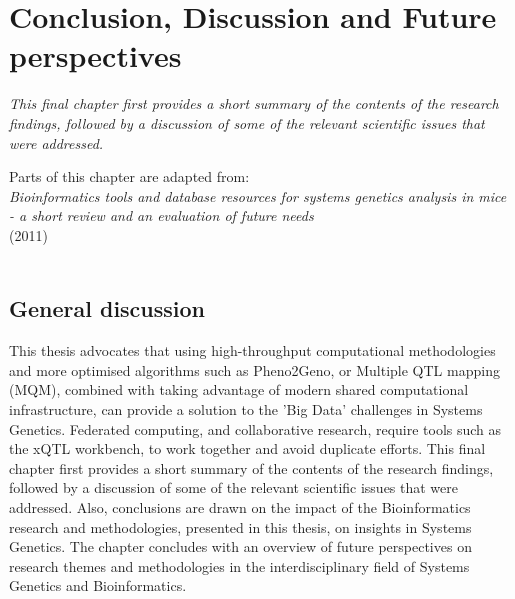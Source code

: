 \chapter{Conclusion, Discussion and Future perspectives}
\thispagestyle{empty}
\emph{This final chapter first provides a short summary of the contents of the research findings, followed by a discussion of 
some of the relevant scientific issues that were addressed.}
\null
\vfill

\begin{myexampleblock}{Parts of this chapter are adapted from:}
  \\
  \emph{ Bioinformatics tools and database resources for systems genetics analysis in mice 
         - a short review and an evaluation of future needs}\\
   (2011)\\\\
\end{myexampleblock}

\newpage

\section{General discussion}
This thesis advocates that using high-throughput computational methodologies and more optimised algorithms such as Pheno2Geno, 
or Multiple QTL mapping (MQM), combined with taking advantage of modern shared computational infrastructure, can provide a solution 
to the 'Big Data' challenges in Systems Genetics. Federated computing, and collaborative research, require tools such as the xQTL 
workbench, to work together and avoid duplicate efforts. This final chapter first provides a short summary of the contents of the 
research findings, followed by a discussion of some of the relevant scientific issues that were addressed. Also, conclusions are drawn 
on the impact of the Bioinformatics research and methodologies, presented in this thesis, on insights in Systems Genetics. The 
chapter concludes with an overview of future perspectives on research themes and methodologies in the interdisciplinary field of 
Systems Genetics and Bioinformatics.

